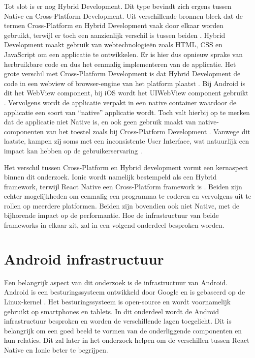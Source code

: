 Tot slot is er nog Hybrid Development. Dit type bevindt zich ergens tussen Native en Cross-Platform Development. Uit verschillende bronnen bleek dat de termen Cross-Platform en Hybrid Development vaak door elkaar worden gebruikt, terwijl er toch een aanzienlijk verschil is tussen beiden \autocite{Bron1, Bron11, Bron12}. Hybrid Development maakt gebruik van webtechnologieën zoals HTML, CSS en JavaScript om een applicatie te ontwikkelen. Er is hier dus opnieuw sprake van herbruikbare code en dus het eenmalig implementeren van de applicatie. Het grote verschil met Cross-Platform Development is dat Hybrid Development de code in een webview of browser-engine van het platform plaatst \autocite{Bron11, Bron1}. Bij Android is dit het WebView component, bij iOS wordt het UIWebView component gebruikt \autocite{Bron4}. Vervolgens wordt de applicatie verpakt in een native container waardoor de applicatie een soort van ``native'' applicatie wordt. Toch valt hierbij op te merken dat de applicatie niet Native is, en ook geen gebruik maakt van native-componenten van het toestel zoals bij Cross-Platform Development \autocite{Bron12, Bron6}. Vanwege dit laatste, kampen zij soms met een inconsistente User Interface, wat natuurlijk een impact kan hebben op de gebruikerservaring \autocite{Bron12}.

Het verschil tussen Cross-Platform en Hybrid development vormt een kernaspect binnen dit onderzoek. Ionic wordt namelijk bestempeld als een Hybrid framework, terwijl React Native een Cross-Platform framework is \autocite{Bron4, Bron1}. Beiden zijn echter mogelijkheden om eenmalig een programma te coderen en vervolgens uit te rollen op meerdere platformen. Beiden zijn bovendien ook niet Native, met de bijhorende impact op de performantie. Hoe de infrastructuur van beide frameworks in elkaar zit, zal in een volgend onderdeel besproken worden.


\section{Android infrastructuur}
\label{sec:android-infrastructuur}

Een belangrijk aspect van dit onderzoek is de infrastructuur van Android. Android is een besturingssysteem ontwikkeld door Google en is gebaseerd op de Linux-kernel \autocite{Bron13}. Het besturingssysteem is open-source en wordt voornamelijk gebruikt op smartphones en tablets. In dit onderdeel wordt de Android infrastructuur besproken en worden de verschillende lagen toegelicht. Dit is belangrijk om een goed beeld te vormen van de onderliggende componenten en hun relaties. Dit zal later in het onderzoek helpen om de verschillen tussen React Native en Ionic beter te begrijpen.

